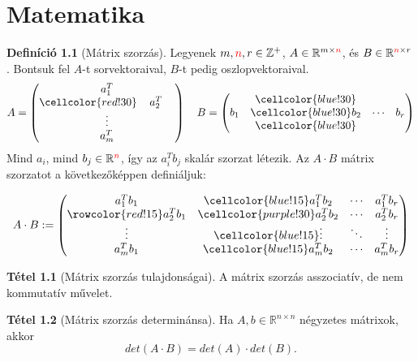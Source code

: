 \documentclass[twocolumn]{report}
\theoremstyle{definition}
\newtheorem{defin}{Definíció}
\newtheorem{tet}{Tétel}
\begin{document}
\chapter{Matematika}
\begin{defin}[Mátrix szorzás]
Legyenek $m,\textcolor{red}n,r \in \mathbb{Z}^+$, $A \in \mathbb{R}^{m \times \textcolor{red}n}$, és $B \in \mathbb{R}^{\textcolor{red}n \times r}$. Bontsuk fel $A$-t sorvektoraival, $B$-t pedig oszlopvektoraival.
\begin{equation}
A = \begin{pmatrix}
a_1^T\\
\cellcolor{red!30}\hphantom{a_2^T} a_2^T \hphantom{a_2^T}\\
\vdots \\
a_m^T\\
\end{pmatrix}
\quad
B = \begin{pmatrix}
 & \cellcolor{blue!30} \\
b_1 & \cellcolor{blue!30} b_2 & \cdots & b_r  \\
 & \cellcolor{blue!30}
\end{pmatrix}
\end{equation}
Mind $a_i$, mind $b_j \in \mathbb{R}^{\textcolor{red}{n}}$, így az $a_i^T b_j$ skalár szorzat létezik. 
Az $A \cdot B$ mátrix szorzatot a következőképpen definiáljuk:

\begin{equation}
A \cdot B := \begin{pmatrix}
a_1^T b_1 & \cellcolor{blue!15}a_1^T b_2 & \cdots & a_1^T b_r \\
\rowcolor{red!15} a_2^T b_1 & \cellcolor{purple!30} a_2^T b_2 & \cdots & a_2^T b_r\\
\vdots & \cellcolor{blue!15} \vdots & \ddots & \vdots \\
a_m^T b_1 & \cellcolor{blue!15}a_m^T b_2 & \cdots & a_m^T b_r
\end{pmatrix}
\end{equation}
\end{defin}

\begin{tet}[Mátrix szorzás tulajdonságai]
A mátrix szorzás asszociatív, de nem kommutatív művelet.
\end{tet}
\begin{tet}[Mátrix szorzás determinánsa]
Ha $A,b \in \mathbb{R}^{n \times n}$ négyzetes mátrixok, akkor
\[det(A \cdot B) = det(A) \cdot det(B).\]
\end{tet}
\end{document}
